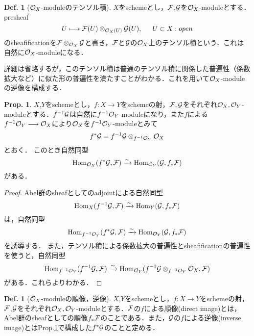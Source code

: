 \documentclass[dvipdfmx,b5paper,papersize]{jsarticle}
\theoremstyle{definition}
\newtheorem{prop}[thm]{Prop.}
\newtheorem{defi}[thm]{Def.}
\begin{document}
\begin{defi}[${\cal{O}}_X$-moduleのテンソル積]
  $X$をschemeとし，$\cal{F}$,$\cal{G}$を${\cal{O}}_X$-moduleとする．presheaf
  \[
    U \longmapsto {\cal{F}}(U) \otimes_{{{\cal{O}}_X}(U)} {\cal{G}}(U), \hspace{15pt} U \subset X:open
  \]
  のsheafificationを${\cal{F}} \otimes_{{\cal{O}}_X} {\cal{G}}$と書き，${\cal{F}}$と${\cal{G}}$の${\cal{O}}_X$上のテンソル積という．これは自然に${\cal{O}}_X$-moduleになる．
\end{defi}
詳細は省略するが，このテンソル積は普通のテンソル積に関係した普遍性（係数拡大など）に似た形の普遍性を満たすことがわかる．これを用いて${\cal{O}}_X$-moduleの逆像を構成する．
\begin{prop}\label{thm:inverse}
  $X$,$Y$をschemeとし，$f:X \longrightarrow Y$をschemeの射，$\cal{F},\cal{G}$をそれぞれ${\cal{O}}_X,{\cal{O}}_Y$-moduleとする．$f^{-1}\cal{G}$は自然に$f^{-1}{\cal{O}}_Y$-moduleになり，また$f$による$f^{-1}{\cal{O}}_Y \longrightarrow {\cal{O}}_X$により${\cal{O}}_X$を$f^{-1}{\cal{O}}_Y$-moduleとみて
  \[
    f^*{\cal{G}}=f^{-1}{\cal{G}} \otimes_{f^{-1}{{\cal{O}}_Y}} {\cal{O}}_X
  \]
  とおく．
  このとき自然同型
  \[
    {\rm Hom}_{{\cal{O}}_X}(f^*{\cal{G}},{\cal{F}}) \xrightarrow{\sim} {\rm Hom}_{{\cal{O}}_Y}({\cal{G}},f_*{{\cal{F}}})
  \]
  がある．
\end{prop}
\begin{proof}
  Abel群のsheafとしてのadjointによる自然同型
  \[
    {\rm Hom}_{X}(f^{-1}{\cal{G}},{\cal{F}}) \xrightarrow{\sim} {\rm Hom}_{Y}({\cal{G}},f_*{{\cal{F}}})
  \]
  は，自然同型
  \[
    {\rm Hom}_{f^{-1}{\cal{O}}_Y}(f^*{\cal{G}},{\cal{F}}) \xrightarrow{\sim} {\rm Hom}_{{\cal{O}}_Y}({\cal{G}},f_*{{\cal{F}}})
    \]
  を誘導する．
  また，テンソル積による係数拡大の普遍性とsheafificationの普遍性を使うと，自然同型
  \[
    {\rm Hom}_{f^{-1}{\cal{O}}_Y}(f^{-1}{\cal{G}},{\cal{F}}) \xrightarrow{\sim} {\rm Hom}_{{\cal{O}}_Y}(f^{-1}{\cal{G}} \otimes_{f^{-1}{{\cal{O}}_Y}} {\cal{O}}_X,{\cal{F}})
  \]
  がある．これらよりわかる．
\end{proof}
\begin{defi}[${\cal{O}}_X$-moduleの順像，逆像]
  $X$,$Y$をschemeとし，$f:X \longrightarrow Y$をschemeの射，$\cal{F}$,$\cal{G}$をそれぞれ${\cal{O}}_X,{\cal{O}}_Y$-moduleとする．${\cal{F}}$の$f$による順像(direct image)とは，Abel群のsheafとしての順像$f_*{{\cal{F}}}$のことである．また，${\cal{G}}$の$f$による逆像(inverse image)とは{\rm Prop.\ref{thm:inverse}}で構成した$f^*{\cal{G}}$のことと定める．
\end{defi}
\end{document}
